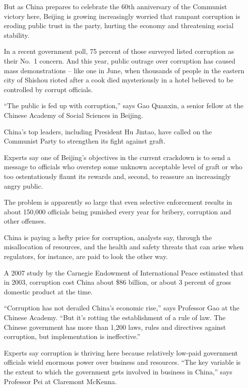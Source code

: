 ﻿\documentclass[12pt]{article}
\begin{document}
But as China prepares to celebrate the 60th anniversary of the Communist victory here, Beijing is
growing increasingly worried that rampant\cite{rampant} corruption is eroding\cite{erode} public
trust in the party, hurting the economy and threatening social stability.

In a recent government poll, 75 percent of those surveyed listed corruption as their No.~1 concern.
And this year, public outrage over corruption has caused mass demonstrations -- like one in June,
when thousands of people in the eastern city of Shishou rioted after a cook died mysteriously in a
hotel believed to be controlled by corrupt officials.

``The public is fed up with corruption,'' says Gao Quanxin, a senior fellow at the Chinese Academy
of Social Sciences in Beijing.

China's top leaders, including President Hu Jintao, have called on the Communist Party to strengthen
its fight against graft\cite{graft}.

Experts say one of Beijing's objectives in the current crackdown is to send a message to officials
who overstep some unknown acceptable level of graft or who too ostentatiously flaunt its rewards
and, second, to reassure an increasingly angry public.

The problem is apparently so large that even selective enforcement results in about 150,000
officials being punished every year for bribery, corruption and other offenses.

China is paying a hefty price for corruption, analysts say, through the misallocation of resources,
and the health and safety threats that can arise when regulators, for instance, are paid to look the
other way.

A 2007 study by the Carnegie Endowment of International Peace estimated that in 2003, corruption
cost China about \$86 billion, or about 3 percent of gross domestic product at the time.

``Corruption has not derailed China's economic rise,'' says Professor Gao at the Chinese Academy.
``But it's rotting the establishment of a rule of law. The Chinese government has more than 1,200
laws, rules and directives against corruption, but implementation is ineffective.''

Experts say corruption is thriving here because relatively low-paid government officials wield
enormous power over business and resources. ``The key variable is the extent to which the government
gets involved in business in China,'' says Professor Pei at Claremont McKenna.
\end{document}

